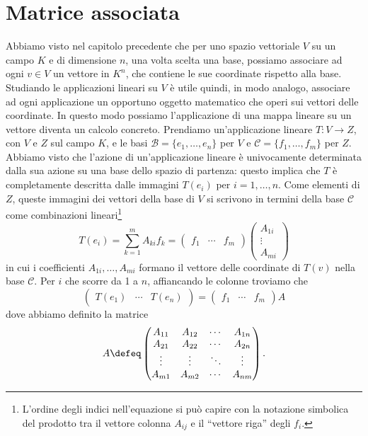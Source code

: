 \section{Matrice associata}
\label{sec:matrice-associata}
Abbiamo visto nel capitolo precedente che per uno spazio vettoriale $V$ su un campo $K$ e di dimensione $n$, una volta scelta una base, possiamo associare ad ogni $v\in V$ un vettore in $K^n$, che contiene le sue coordinate rispetto alla base.
Studiando le applicazioni lineari su $V$ è utile quindi, in modo analogo, associare ad ogni applicazione un opportuno oggetto matematico che operi sui vettori delle coordinate.
In questo modo possiamo l'applicazione di una mappa lineare su un vettore diventa un calcolo concreto.
Prendiamo un'applicazione lineare $T\colon V\to Z$, con $V$ e $Z$ sul campo $K$, e le basi $\mathcal B=\{e_1,\dots,e_n\}$ per $V$ e $\mathcal C=\{f_1,\dots,f_m\}$ per $Z$.
Abbiamo visto che l'azione di un'applicazione lineare è univocamente determinata dalla sua azione su una base dello spazio di partenza: questo implica che $T$ è completamente descritta dalle immagini $T(e_i)$ per $i=1,\dots,n$.
Come elementi di $Z$, queste immagini dei vettori della base di $V$ si scrivono in termini della base $\mathcal C$ come combinazioni lineari\footnote{
	L'ordine degli indici nell'equazione si può capire con la notazione simbolica del prodotto tra il vettore colonna $A_{ij}$ e il ``vettore riga'' degli $f_i$.
}
\begin{equation}
	T(e_i)=\sum_{k=1}^mA_{ki}f_k=
	\begin{pmatrix}
		f_1&\cdots&f_m
	\end{pmatrix}
	\begin{pmatrix}
		A_{1i}\\
		\vdots\\
		A_{mi}
	\end{pmatrix}
\end{equation}
in cui i coefficienti $A_{1i},\dots,A_{mi}$ formano il vettore delle coordinate di $T(v)$ nella base $\mathcal C$.
Per $i$ che scorre da 1 a $n$, affiancando le colonne troviamo che
\begin{equation}
	\begin{pmatrix}
		T(e_1)&\cdots&T(e_n)
	\end{pmatrix}
	=
	\begin{pmatrix}
		f_1&\cdots&f_m
	\end{pmatrix}
	A
\end{equation}
dove abbiamo definito la matrice
\begin{equation}
	A\defeq
	\begin{pmatrix}
		A_{11}&A_{12}&\cdots&A_{1n}\\
		A_{21}&A_{22}&\cdots&A_{2n}\\
		\vdots&\vdots&\ddots&\vdots\\
		A_{m1}&A_{m2}&\cdots&A_{nm}
	\end{pmatrix}.
	\label{eq:matrice-associata}
\end{equation}
